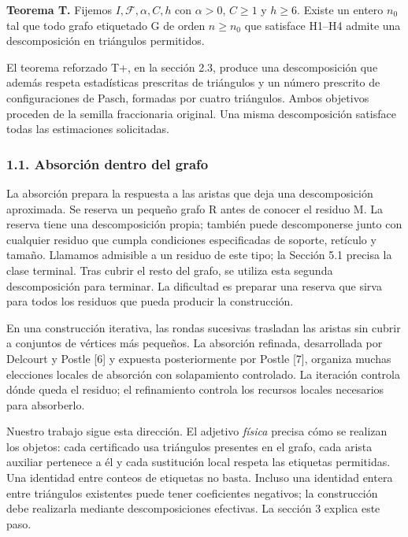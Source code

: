 \documentclass[spanish,11pt,a4paper]{article}
\begin{document}
\textbf{Teorema T.} Fijemos \(I,\mathcal F,\alpha,C,h\) con \(\alpha>0\), \(C\geq1\) y \(h\geq6\). Existe un entero \(n_0\) tal que todo grafo etiquetado G de orden \(n\geq n_0\) que satisface H1--H4 admite una descomposición en triángulos permitidos.

El teorema reforzado T+, en la sección 2.3, produce una descomposición que además respeta estadísticas prescritas de triángulos y un número prescrito de configuraciones de Pasch, formadas por cuatro triángulos. Ambos objetivos proceden de la semilla fraccionaria original. Una misma descomposición satisface todas las estimaciones solicitadas.

\subsubsection{1.1. Absorción dentro del grafo}\label{absorciuxf3n-dentro-del-grafo}

La absorción prepara la respuesta a las aristas que deja una descomposición aproximada. Se reserva un pequeño grafo R antes de conocer el residuo M. La reserva tiene una descomposición propia; también puede descomponerse junto con cualquier residuo que cumpla condiciones especificadas de soporte, retículo y tamaño. Llamamos admisible a un residuo de este tipo; la Sección 5.1 precisa la clase terminal. Tras cubrir el resto del grafo, se utiliza esta segunda descomposición para terminar. La dificultad es preparar una reserva que sirva para todos los residuos que pueda producir la construcción.

En una construcción iterativa, las rondas sucesivas trasladan las aristas sin cubrir a conjuntos de vértices más pequeños. La absorción refinada, desarrollada por Delcourt y Postle {[}6{]} y expuesta posteriormente por Postle {[}7{]}, organiza muchas elecciones locales de absorción con solapamiento controlado. La iteración controla dónde queda el residuo; el refinamiento controla los recursos locales necesarios para absorberlo.

Nuestro trabajo sigue esta dirección. El adjetivo \emph{física} precisa cómo se realizan los objetos: cada certificado usa triángulos presentes en el grafo, cada arista auxiliar pertenece a él y cada sustitución local respeta las etiquetas permitidas. Una identidad entre conteos de etiquetas no basta. Incluso una identidad entera entre triángulos existentes puede tener coeficientes negativos; la construcción debe realizarla mediante descomposiciones efectivas. La sección 3 explica este paso.
\end{document}
